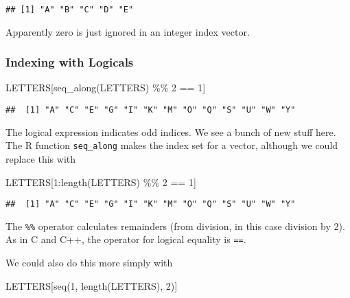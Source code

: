 \documentclass[
]{article}
\newenvironment{Shaded}{\begin{snugshade}}{\end{snugshade}}
\newcommand{\DecValTok}[1]{\textcolor[rgb]{0.00,0.00,0.81}{#1}}
\newcommand{\FunctionTok}[1]{\textcolor[rgb]{0.00,0.00,0.00}{#1}}
\newcommand{\NormalTok}[1]{#1}
\newcommand{\SpecialCharTok}[1]{\textcolor[rgb]{0.00,0.00,0.00}{#1}}
\begin{document}
\begin{verbatim}
## [1] "A" "B" "C" "D" "E"
\end{verbatim}

Apparently zero is just ignored in an integer index vector.

\hypertarget{indexing-with-logicals}{%
\subsubsection{Indexing with Logicals}\label{indexing-with-logicals}}

\begin{Shaded}
\begin{Highlighting}[]
\NormalTok{LETTERS[}\FunctionTok{seq\_along}\NormalTok{(LETTERS) }\SpecialCharTok{\%\%} \DecValTok{2} \SpecialCharTok{==} \DecValTok{1}\NormalTok{]}
\end{Highlighting}
\end{Shaded}

\begin{verbatim}
##  [1] "A" "C" "E" "G" "I" "K" "M" "O" "Q" "S" "U" "W" "Y"
\end{verbatim}

The logical expression indicates odd indices. We see a bunch of new
stuff here. The R function \texttt{seq\_along} makes the index set for a
vector, although we could replace this with

\begin{Shaded}
\begin{Highlighting}[]
\NormalTok{LETTERS[}\DecValTok{1}\SpecialCharTok{:}\FunctionTok{length}\NormalTok{(LETTERS) }\SpecialCharTok{\%\%} \DecValTok{2} \SpecialCharTok{==} \DecValTok{1}\NormalTok{]}
\end{Highlighting}
\end{Shaded}

\begin{verbatim}
##  [1] "A" "C" "E" "G" "I" "K" "M" "O" "Q" "S" "U" "W" "Y"
\end{verbatim}

The \texttt{\%\%} operator calculates remainders (from division, in this
case division by 2). As in C and C++, the operator for logical equality
is \texttt{==}.

\pagebreak[3]

We could also do this more simply with

\begin{Shaded}
\begin{Highlighting}[]
\NormalTok{LETTERS[}\FunctionTok{seq}\NormalTok{(}\DecValTok{1}\NormalTok{, }\FunctionTok{length}\NormalTok{(LETTERS), }\DecValTok{2}\NormalTok{)]}
\end{Highlighting}
\end{Shaded}
\end{document}
